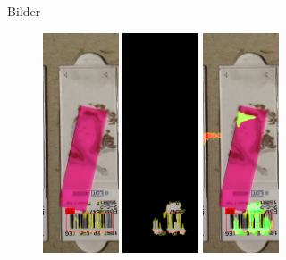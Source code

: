 \documentclass{beamer}
\begin{document}
  \begin{frame}{Bilder}
    \begin{figure}
      \includegraphics[width=0.2\textwidth]{./assets/Cell104473_2_4_top1_positiveonlywithrest.PNG}
      \hfill
      \includegraphics[width=0.2\textwidth]{./assets/Cell104473_2_4_top1_positiveonly.PNG}
      \hfill
      \includegraphics[width=0.2\textwidth]{./assets/Cell104473_2_4_top1_proscons.PNG}

\end{figure}
\end{frame}
\end{document}

